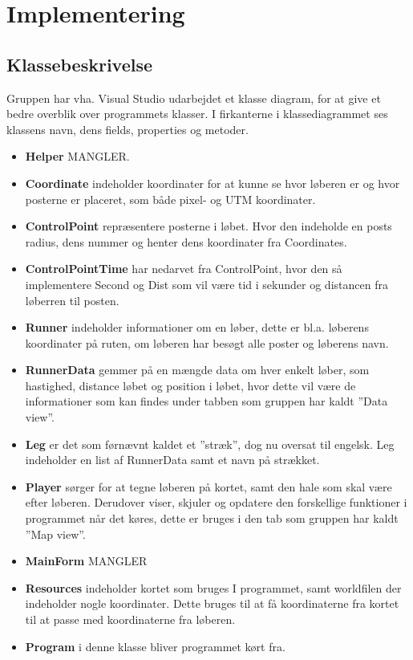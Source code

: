 \chapter{Implementering}

\section{Klassebeskrivelse}
Gruppen har vha. Visual Studio udarbejdet et klasse diagram, for at give et bedre overblik over programmets klasser. I firkanterne i klassediagrammet ses klassens navn, dens fields, properties og metoder.
\begin {itemize}
\item \textbf{Helper} MANGLER.
\item \textbf{Coordinate} indeholder koordinater for at kunne se hvor løberen er og hvor posterne er placeret, som både pixel- og UTM koordinater. 
\item \textbf{ControlPoint} repræsentere posterne i løbet. Hvor den indeholde en posts radius, dens nummer og henter dens koordinater fra Coordinates.
\item \textbf{ControlPointTime} har nedarvet fra ControlPoint, hvor den så implementere Second og Dist som vil være tid i sekunder og distancen fra løberren til posten. 
\item \textbf{Runner} indeholder informationer om en løber, dette er bl.a. løberens koordinater på ruten, om løberen har besøgt alle poster og løberens navn.
\item \textbf{RunnerData} gemmer på en mængde data om hver enkelt løber, som hastighed, distance løbet og position i løbet, hvor dette vil være de informationer som kan findes under tabben som gruppen har kaldt ”Data view”. 
\item \textbf{Leg} er det som førnævnt kaldet et ”stræk”, dog nu oversat til engelsk. Leg indeholder en list af RunnerData samt et navn på strækket.
\item \textbf{Player} sørger for at tegne løberen på kortet, samt den hale som skal være efter løberen. Derudover viser, skjuler og opdatere den forskellige funktioner i programmet når det køres, dette er bruges i den tab som gruppen har kaldt ”Map view”.
\item \textbf{MainForm} MANGLER
\item \textbf{Resources} indeholder kortet som bruges I programmet, samt worldfilen der indeholder nogle koordinater. Dette bruges til at få koordinaterne fra kortet til at passe med koordinaterne fra løberen.
\item \textbf{Program} i denne klasse bliver programmet kørt fra.	
\end {itemize}

